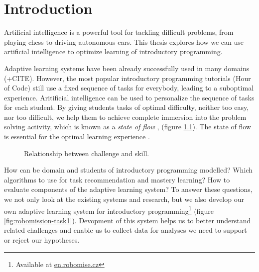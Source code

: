 \chapter{Introduction}
\label{chap:introduction}

Artificial intelligence is a powerful tool for tackling difficult problems,
from playing chess to driving autonomous cars.
This thesis explores how we can use artificial intelligence to optimize
learning of introductory programming.

Adaptive learning systems have been already successfully used in many domains
\cite{alg.evaluation-geography} (+CITE).
However, the most popular introductory programming tutorials
(Hour of Code) still use a fixed sequence of tasks for everybody,
leading to a suboptimal experience.
Aritificial intelligence can be used to personalize the sequence of tasks
for each student.
By giving students tasks of optimal difficulty, neither too easy, nor too
difficult, we help them to achieve complete immersion into the problem solving
activity, which is known as a \emph{state of flow} \cite{flow},
(figure \ref{fig:flow}).
The state of flow is essential for the optimal learning experience
\cite{adaptive-practice}.

\begin{figure}[htb]
  \centering
  \caption{Relationship between challenge and skill.}
  \label{fig:flow}
\end{figure}


How can be domain and students of introductory programming modelled?
Which algorithms to use for task recommendation and mastery learning?
How to evaluate components of the adaptive learning system?
To answer these questions, we not only look at the existing systems
and research, but we also develop our own adaptive learning system for
introductory programming\footnote{Available at \url{en.robomise.cz}}
(figure \ref{fig:robomission-task1}).
Devopment of this system helps us to better understand related challenges
and enable us to collect data for analyses we need to support or reject our hypotheses.

